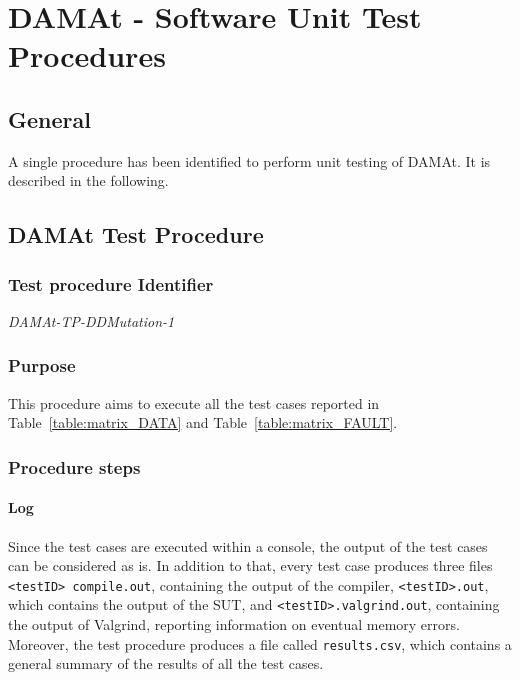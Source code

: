 
\chapter{DAMAt - Software Unit Test Procedures}
\label{chap:proc_DAMAt}

\section{General}

A single procedure has been identified to perform unit testing of DAMAt. It is described in the following.

\section{DAMAt Test Procedure}

\subsection{Test procedure Identifier}

\emph{DAMAt-TP-DDMutation-1}


\subsection{Purpose}

This procedure aims to execute all the test cases reported in Table~\ref{table:matrix_DATA} and Table~\ref{table:matrix_FAULT}.

\subsection{Procedure steps}

\subsubsection{Log}
Since the test cases are executed within a console, the output of the test cases can be considered as is.
In addition to that, every test case produces three files \texttt{<testID> compile.out}, containing the output of the compiler, \texttt{<testID>.out}, which contains the output of the SUT, and \texttt{<testID>.valgrind.out}, containing the output of Valgrind, reporting information on eventual memory errors.
Moreover, the test procedure produces a file called \texttt{results.csv}, which contains a general summary of the results of all the test cases.

